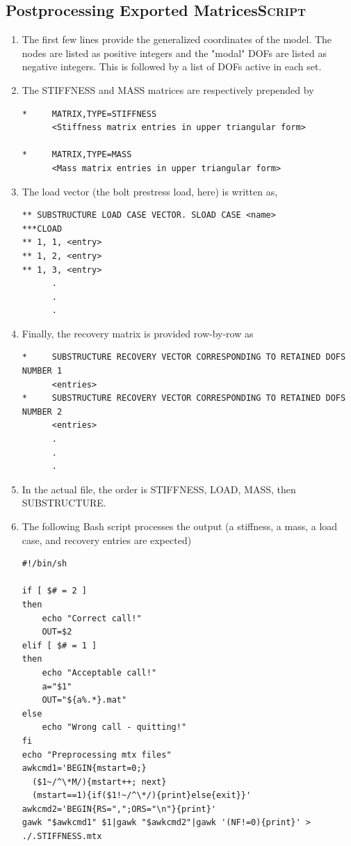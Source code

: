 \documentclass[11pt]{article}
\begin{document}
\subsection{Postprocessing Exported Matrices\hfill{}\textsc{Script}}
\label{sec:bscr}
\begin{enumerate}
\item The first few lines provide the generalized coordinates of the model. The nodes are listed as positive integers and the "modal" DOFs are listed as negative integers.
This is followed by a list of DOFs active in each set.
\item The STIFFNESS and MASS matrices are respectively prepended by
\begin{verbatim}
*     MATRIX,TYPE=STIFFNESS
      <Stiffness matrix entries in upper triangular form>

*     MATRIX,TYPE=MASS
      <Mass matrix entries in upper triangular form>      
\end{verbatim}
\item The load vector (the bolt prestress load, here) is written as,
\begin{verbatim}
** SUBSTRUCTURE LOAD CASE VECTOR. SLOAD CASE <name>
***CLOAD 
** 1, 1, <entry>
** 1, 2, <entry>
** 1, 3, <entry>
      .
      .
      .
\end{verbatim}
\item Finally, the recovery matrix is provided row-by-row as
\begin{verbatim}
*     SUBSTRUCTURE RECOVERY VECTOR CORRESPONDING TO RETAINED DOFS NUMBER 1
      <entries>
*     SUBSTRUCTURE RECOVERY VECTOR CORRESPONDING TO RETAINED DOFS NUMBER 2
      <entries>
      .
      .
      .
\end{verbatim}
\item In the actual file, the order is STIFFNESS, LOAD, MASS, then SUBSTRUCTURE.
\item The following Bash script processes the output (a stiffness, a mass, a load case, and recovery entries are expected)
\begin{verbatim}
#!/bin/sh

if [ $# = 2 ]
then 
    echo "Correct call!"
    OUT=$2
elif [ $# = 1 ]
then
    echo "Acceptable call!"
    a="$1"
    OUT="${a%.*}.mat"
else
    echo "Wrong call - quitting!"
fi
echo "Preprocessing mtx files"
awkcmd1='BEGIN{mstart=0;}
  ($1~/^\*M/){mstart++; next}
  (mstart==1){if($1!~/^\*/){print}else{exit}}'
awkcmd2='BEGIN{RS=",";ORS="\n"}{print}'
gawk "$awkcmd1" $1|gawk "$awkcmd2"|gawk '(NF!=0){print}' > ./.STIFFNESS.mtx


\end{verbatim}
\end{enumerate}
\end{document}
